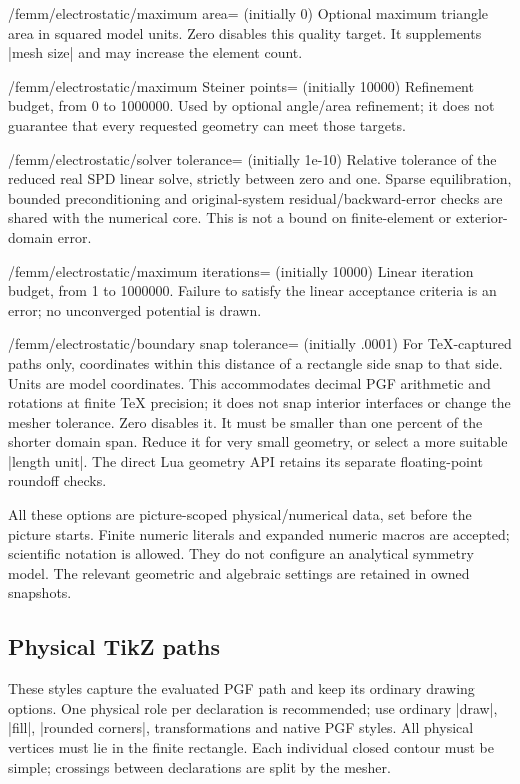 \begin{key}{/femm/electrostatic/maximum area= (initially 0)}
Optional maximum triangle area in squared model units. Zero disables this
quality target. It supplements |mesh size| and may increase the element count.
\end{key}
\begin{key}{/femm/electrostatic/maximum Steiner points= (initially 10000)}
Refinement budget, from 0 to 1000000. Used by optional angle/area refinement;
it does not guarantee that every requested geometry can meet those targets.
\end{key}
\begin{key}{/femm/electrostatic/solver tolerance= (initially 1e-10)}
Relative tolerance of the reduced real SPD linear solve, strictly between
zero and one. Sparse equilibration, bounded preconditioning and original-system
residual/backward-error checks are shared with the numerical core. This is
not a bound on finite-element or exterior-domain error.
\end{key}
\begin{key}{/femm/electrostatic/maximum iterations= (initially 10000)}
Linear iteration budget, from 1 to 1000000. Failure to satisfy the linear
acceptance criteria is an error; no unconverged potential is drawn.
\end{key}
\begin{key}{/femm/electrostatic/boundary snap tolerance= (initially .0001)}
For TeX-captured paths only, coordinates within this distance of a rectangle
side snap to that side. Units are model coordinates. This accommodates decimal
PGF arithmetic and rotations at finite TeX precision; it does not snap interior
interfaces or change the mesher tolerance. Zero disables it. It must be smaller
than one percent of the shorter domain span. Reduce it for very small geometry,
or select a more suitable |length unit|. The direct Lua geometry API retains
its separate floating-point roundoff checks.
\end{key}

All these options are picture-scoped physical/numerical data, set before the
picture starts. Finite numeric literals and expanded numeric macros are
accepted; scientific notation is allowed. They do not configure an analytical
symmetry model. The relevant geometric and algebraic settings are retained in
owned snapshots.

\subsection{Physical TikZ paths}
\label{sec:electric-fe-paths}
These styles capture the evaluated PGF path and keep its ordinary drawing
options. One physical role per declaration is recommended; use ordinary
|draw|, |fill|, |rounded corners|, transformations and native PGF styles.
All physical vertices must lie in the finite rectangle. Each individual closed
contour must be simple; crossings between declarations are split by the mesher.

